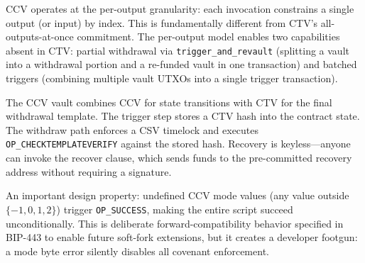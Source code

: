 CCV operates at the per-output granularity: each invocation constrains a single output
(or input) by index. This is fundamentally different from CTV's all-outputs-at-once
commitment. The per-output model enables two capabilities absent in CTV: partial
withdrawal via \texttt{trigger\_and\_revault} (splitting a vault into a withdrawal
portion and a re-funded vault in one transaction) and batched triggers (combining
multiple vault UTXOs into a single trigger transaction).

The CCV vault combines CCV for state transitions with CTV for the final withdrawal
template. The trigger step stores a CTV hash into the contract state. The withdraw
path enforces a CSV timelock and executes \texttt{OP\_CHECKTEMPLATEVERIFY} against the
stored hash. Recovery is keyless---anyone can invoke the recover clause, which sends
funds to the pre-committed recovery address without requiring a signature.

An important design property: undefined CCV mode values (any value outside
$\{-1, 0, 1, 2\}$) trigger \texttt{OP\_SUCCESS}, making the entire script succeed
unconditionally. This is deliberate forward-compatibility behavior specified in
BIP-443 to enable future soft-fork extensions, but it creates a developer footgun:
a mode byte error silently disables all covenant enforcement.

